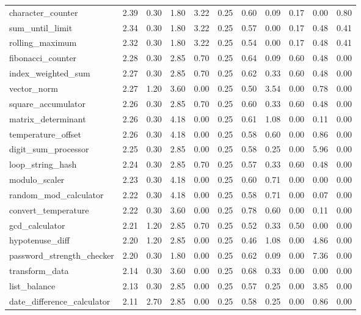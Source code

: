 \documentclass[8pt]{extarticle}
\begin{document}
\begin{table}[H]
\begin{tabular}{|l|c|c|c|c|c|c|c|c|c|c|}
character\_counter & 2.39 & 0.30 & 1.80 & 3.22 & 0.25 & 0.60 & 0.09 & 0.17 & 0.00 & 0.80 \\
sum\_until\_limit & 2.34 & 0.30 & 1.80 & 3.22 & 0.25 & 0.57 & 0.00 & 0.17 & 0.48 & 0.41 \\
rolling\_maximum & 2.32 & 0.30 & 1.80 & 3.22 & 0.25 & 0.54 & 0.00 & 0.17 & 0.48 & 0.41 \\
fibonacci\_counter & 2.28 & 0.30 & 2.85 & 0.70 & 0.25 & 0.64 & 0.09 & 0.60 & 0.48 & 0.00 \\
index\_weighted\_sum & 2.27 & 0.30 & 2.85 & 0.70 & 0.25 & 0.62 & 0.33 & 0.60 & 0.48 & 0.00 \\
vector\_norm & 2.27 & 1.20 & 3.60 & 0.00 & 0.25 & 0.50 & 3.54 & 0.00 & 0.78 & 0.00 \\
square\_accumulator & 2.26 & 0.30 & 2.85 & 0.70 & 0.25 & 0.60 & 0.33 & 0.60 & 0.48 & 0.00 \\
matrix\_determinant & 2.26 & 0.30 & 4.18 & 0.00 & 0.25 & 0.61 & 1.08 & 0.00 & 0.11 & 0.00 \\
temperature\_offset & 2.26 & 0.30 & 4.18 & 0.00 & 0.25 & 0.58 & 0.60 & 0.00 & 0.86 & 0.00 \\
digit\_sum\_processor & 2.25 & 0.30 & 2.85 & 0.00 & 0.25 & 0.58 & 0.25 & 0.00 & 5.96 & 0.00 \\
loop\_string\_hash & 2.24 & 0.30 & 2.85 & 0.70 & 0.25 & 0.57 & 0.33 & 0.60 & 0.48 & 0.00 \\
modulo\_scaler & 2.23 & 0.30 & 4.18 & 0.00 & 0.25 & 0.60 & 0.71 & 0.00 & 0.00 & 0.00 \\
random\_mod\_calculator & 2.22 & 0.30 & 4.18 & 0.00 & 0.25 & 0.58 & 0.71 & 0.00 & 0.07 & 0.00 \\
convert\_temperature & 2.22 & 0.30 & 3.60 & 0.00 & 0.25 & 0.78 & 0.60 & 0.00 & 0.11 & 0.00 \\
gcd\_calculator & 2.21 & 1.20 & 2.85 & 0.70 & 0.25 & 0.52 & 0.33 & 0.50 & 0.00 & 0.00 \\
hypotenuse\_diff & 2.20 & 1.20 & 2.85 & 0.00 & 0.25 & 0.46 & 1.08 & 0.00 & 4.86 & 0.00 \\
password\_strength\_checker & 2.20 & 0.30 & 1.80 & 0.00 & 0.25 & 0.62 & 0.09 & 0.00 & 7.36 & 0.00 \\
transform\_data & 2.14 & 0.30 & 3.60 & 0.00 & 0.25 & 0.68 & 0.33 & 0.00 & 0.00 & 0.00 \\
list\_balance & 2.13 & 0.30 & 2.85 & 0.00 & 0.25 & 0.57 & 0.25 & 0.00 & 3.85 & 0.00 \\
date\_difference\_calculator & 2.11 & 2.70 & 2.85 & 0.00 & 0.25 & 0.58 & 0.25 & 0.00 & 0.86 & 0.00 \\

\end{tabular}
\end{table}
\end{document}
